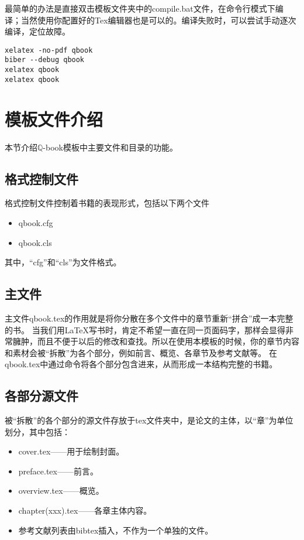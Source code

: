 最简单的办法是直接双击模板文件夹中的compile.bat文件，在命令行模式下编译；当然使用你配置好的Tex编辑器也是可以的。编译失败时，可以尝试手动逐次编译，定位故障。
\begin{lstlisting}[basicstyle=\small\ttfamily, caption={手动逐次编译}, numbers=none]
xelatex -no-pdf qbook
biber --debug qbook
xelatex qbook
xelatex qbook
\end{lstlisting}

\section{模板文件介绍}

本节介绍$\mathbb{ Q }$-book模板中主要文件和目录的功能。

\subsection{格式控制文件}

格式控制文件控制着书籍的表现形式，包括以下两个文件
\begin{itemize}[noitemsep,topsep=0pt,parsep=0pt,partopsep=0pt]
	\item qbook.cfg
	\item qbook.cls
\end{itemize}
其中，“cfg”和“cls”为文件格式。

\subsection{主文件}

主文件qbook.tex的作用就是将你分散在多个文件中的章节重新“拼合”成一本完整的书。
当我们用\LaTeX 写书时，肯定不希望一直在同一页面码字，那样会显得非常臃肿，而且不便于以后的修改和查找。所以在使用本模板的时候，你的章节内容和素材会被“拆散”为各个部分，例如前言、概览、各章节及参考文献等。
在qbook.tex中通过\verb||命令将各个部分包含进来，从而形成一本结构完整的书籍。

\subsection{各部分源文件}

被“拆散”的各个部分的源文件存放于tex文件夹中，是论文的主体，以“章”为单位划分，其中包括：

\begin{itemize}[noitemsep,topsep=0pt,parsep=0pt,partopsep=0pt]
	\item cover.tex——用于绘制封面。
	\item preface.tex——前言。
	\item overview.tex——概览。
	\item chapter(xxx).tex——各章主体内容。
	\item 参考文献列表由bibtex插入，不作为一个单独的文件。
\end{itemize}

